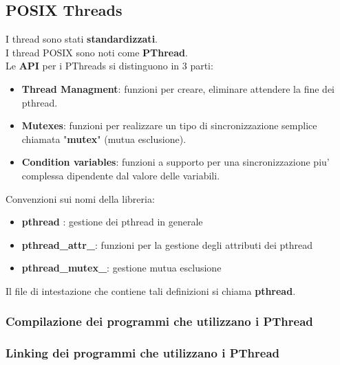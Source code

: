 \documentclass{article}
\begin{document}
    \subsection{POSIX Threads}
    I thread sono stati \textbf{standardizzati}.
    \\
    I thread POSIX sono noti come \textbf{PThread}.
    \\
    Le \textbf{API} per i PThreads si distinguono in 3 parti:
    \begin{itemize}
       \item \textbf{Thread Managment}: funzioni per creare, eliminare 
        attendere la fine dei pthread.
       \item \textbf{Mutexes}: funzioni per realizzare un tipo di sincronizzazione
       semplice chiamata "\textbf{mutex}" (mutua esclusione).
       \item \textbf{Condition variables}: funzioni a supporto per una sincronizzazione
       piu' complessa dipendente dal valore delle variabili.
    \end{itemize}
    Convenzioni sui nomi della libreria:
    \begin{itemize}
       \item \textbf{pthread} : gestione dei pthread in generale
       \item \textbf{pthread\_attr\_}: funzioni per la gestione degli attributi
       dei pthread
       \item \textbf{pthread\_mutex\_}: gestione mutua esclusione
    \end{itemize}
    Il file di intestazione che contiene tali definizioni si chiama 
    \textbf{pthread}.
    \subsubsection{Compilazione dei programmi che utilizzano i PThread}

    \subsubsection{Linking dei programmi che utilizzano i PThread}
\end{document}
